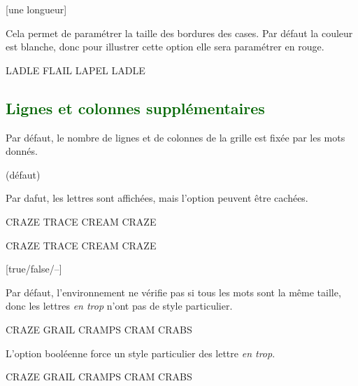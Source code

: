 \documentclass[svgnames]{report}
\newcommand\Section[1]{\subsection{\textcolor{DarkGreen}{#1}}}
\begin{document}
  [une longueur]

  Cela permet de paramétrer la taille des bordures des cases. Par défaut la couleur est blanche, donc pour illustrer cette option elle sera paramétrer en rouge.

  \begin{example}
  \begin{GrilleSutom}[Epaisseur=0.75mm,CouleurBordures=red]{LADLE}
     FLAIL
     LAPEL
     LADLE
  \end{GrilleSutom}
  \end{example}

  \Section{Lignes et colonnes supplémentaires}

  Par défaut, le nombre de lignes et de colonnes de la grille est fixée par les mots donnés.

   (défaut)\qquad

  Par dafut, les lettres sont affichées, mais l'option  peuvent être cachées.

  \begin{example}
  \begin{GrilleSutom}{CRAZE} %
    TRACE
    CREAM
    CRAZE
  \end{GrilleSutom}
  \end{example}

  \begin{example}
  \begin{GrilleSutom}[NonLettres]{CRAZE}
    TRACE
    CREAM
    CRAZE
  \end{GrilleSutom}
  \end{example}

  [true/false/--]

  Par défaut, l'environnement ne vérifie pas si tous les mots sont la même taille, donc les lettres \textit{en trop} n'ont pas de style particulier.

  \begin{example}
  \begin{GrilleSutom}[Strict=false]{CRAZE} %
    GRAIL
    CRAMPS
    CRAM
    CRABS
  \end{GrilleSutom}
  \end{example}

  L'option booléenne  force un style particulier des lettre \textit{en trop}.

  \begin{example}
  \begin{GrilleSutom}[Strict]{CRAZE}
    GRAIL
    CRAMPS
    CRAM
    CRABS
  \end{GrilleSutom}
  \end{example}
\end{document}
